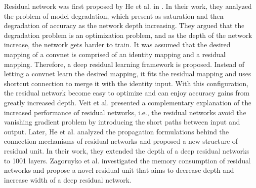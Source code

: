\documentclass[runningheads]{llncs}
\begin{document}
Residual network was first proposed by He et al. in \cite{he2016deep}. In their work, they analyzed the problem of model degradation, which present as saturation and then degradation of accuracy as the network depth increasing. They argued that the degradation problem is an optimization problem, and as the depth of the network increase, the network gets harder to train. It was assumed that the desired mapping of a convnet is comprised of an identity mapping and a residual mapping. Therefore, a deep residual learning framework is proposed. Instead of letting a convnet learn the desired mapping, it fits the residual mapping and uses shortcut connection to merge it with the identity input. With this configuration, the residual network become easy to optimize and can enjoy accuracy gains from greatly increased depth. Veit et al. \cite{veit2016residual} presented a complementary explanation of the increased performance of residual networks, i.e., the residual networks avoid the vanishing gradient problem by introducing the short paths between input and output. Later, He et al. \cite{he2016identity} analyzed the propagation formulations behind the connection mechanisms of residual networks and proposed a new structure of residual unit. In their work, they extended the depth of a deep residual networks to 1001 layers.  Zagoruyko et al. \cite{zagoruyko2016wide} investigated the memory consumption of residual networks and propose a novel residual unit that aims to decrease depth and increase width of a deep residual network.
\end{document}
